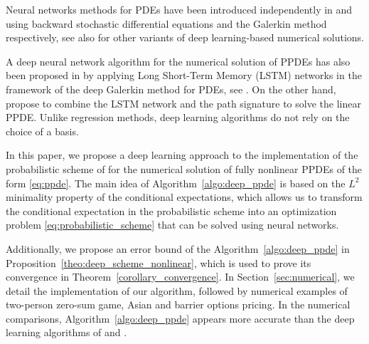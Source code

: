 \documentclass[12pt]{article}
\numberwithin{equation}{section}
\let\oldcitet=\citet
\renewcommand{\cite}[1]{\textcolor[rgb]{0,0,1}{\oldcitet{#1}}}
\renewcommand{\citet}[1]{\textcolor[rgb]{0,0,1}{\oldcitet{#1}}}
\begin{document}
\medskip

Neural networks methods for PDEs have been introduced independently in
\cite{han2018solving} and \cite{sirignano2018dgm}
using backward stochastic differential equations and
the Galerkin method respectively, see also
\cite{beck2019deep,hure2019some}
for other variants of deep learning-based numerical solutions.

\medskip

 A deep neural network algorithm for the numerical solution of PPDEs
 has also been proposed in \cite{saporito2020pdgm}
 by applying Long Short-Term Memory (LSTM) networks
 in the framework of the deep Galerkin method for PDEs,
 see \cite{sirignano2018dgm}.
On the other hand, \cite{sabate2020solving} propose to combine
the LSTM network and the path signature to solve the linear PPDE.
Unlike regression methods, deep learning algorithms do
not rely on the choice of a basis.

\medskip

In this paper, we propose a deep learning approach
 to the implementation of the probabilistic scheme of \cite{ren2017convergence}
 for the numerical solution of
 fully nonlinear PPDEs of the form \eqref{eq:ppde}.
 The main idea of Algorithm~\ref{algo:deep_ppde}
is based on the $L^2$ minimality property
of the conditional expectations,
which allows us to transform the conditional expectation
in the probabilistic scheme into an optimization problem
\eqref{eq:probabilistic_scheme} that can be solved using neural networks.

\medskip

Additionally, we propose an error bound of the Algorithm~\ref{algo:deep_ppde}
in Proposition~\ref{theo:deep_scheme_nonlinear},
which is used to prove its convergence %
in Theorem~\ref{corollary_convergence}.
In Section~\ref{sec:numerical},
we detail the implementation of our algorithm,
followed by numerical examples of
two-person zero-sum game, Asian and barrier options pricing.
In the numerical comparisons,
 Algorithm~\ref{algo:deep_ppde} appears more accurate
than the deep learning algorithms
of \cite{saporito2020pdgm} and \cite{sabate2020solving}.

\medskip
\end{document}
